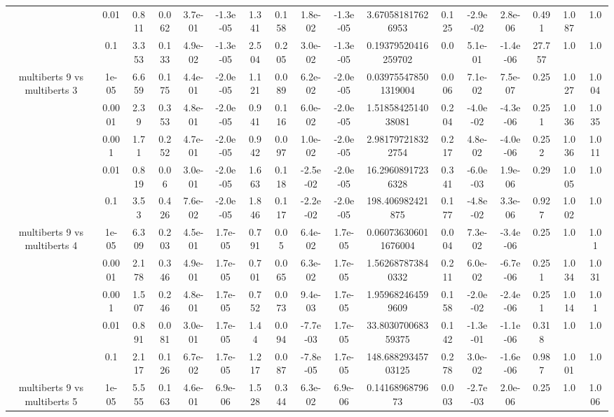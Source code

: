 \begin{tabular}{|c|c|c|c|c|c|c|c|c|c|c|c|c|c|c|c|c|}
 & 0.01 & 0.811 & 0.062 & 3.7e-01 & -1.3e-05 & 1.341 & 0.158 & 1.8e-02 & -1.3e-05 & 3.670581817626953 & 0.125 & -2.9e-02 & 2.8e-06 & 0.491 & 1.087 & 1.0 \\
 & 0.1 & 3.353 & 0.133 & 4.9e-02 & -1.3e-05 & 2.504 & 0.205 & 3.0e-02 & -1.3e-05 & 0.19379520416259702 & 0.0 & 5.1e-01 & -1.4e-06 & 27.757 & 1.0 & 1.0 \\
\hline
\multirow{5}{*}{multiberts 9 vs multiberts 3} & 1e-05 & 6.659 & 0.175 & 4.4e-01 & -2.0e-05 & 1.121 & 0.089 & 6.2e-02 & -2.0e-05 & 0.039755478501319004 & 0.006 & 7.1e-02 & 7.5e-07 & 0.25 & 1.027 & 1.004 \\
 & 0.0001 & 2.39 & 0.353 & 4.8e-01 & -2.0e-05 & 0.941 & 0.116 & 6.0e-02 & -2.0e-05 & 1.5185842514038081 & 0.204 & -4.0e-02 & -4.3e-06 & 0.251 & 1.036 & 1.035 \\
 & 0.001 & 1.71 & 0.252 & 4.7e-01 & -2.0e-05 & 0.942 & 0.097 & 1.0e-02 & -2.0e-05 & 2.981797218322754 & 0.217 & 4.8e-02 & -4.0e-06 & 0.252 & 1.036 & 1.011 \\
 & 0.01 & 0.819 & 0.06 & 3.0e-01 & -2.0e-05 & 1.663 & 0.118 & -2.5e-02 & -2.0e-05 & 16.29608917236328 & 0.341 & -6.0e-03 & 1.9e-06 & 0.29 & 1.005 & 1.0 \\
 & 0.1 & 3.53 & 0.426 & 7.6e-02 & -2.0e-05 & 1.846 & 0.117 & -2.2e-02 & -2.0e-05 & 198.406982421875 & 0.177 & -4.8e-02 & 3.3e-06 & 0.927 & 1.002 & 1.0 \\
\hline
\multirow{5}{*}{multiberts 9 vs multiberts 4} & 1e-05 & 6.309 & 0.203 & 4.5e-01 & 1.7e-05 & 0.791 & 0.05 & 6.4e-02 & 1.7e-05 & 0.060736306011676004 & 0.004 & 7.3e-02 & -3.4e-06 & 0.25 & 1.0 & 1.01 \\
 & 0.0001 & 2.178 & 0.346 & 4.9e-01 & 1.7e-05 & 0.701 & 0.065 & 6.3e-02 & 1.7e-05 & 1.562687873840332 & 0.211 & 6.0e-02 & -6.7e-06 & 0.251 & 1.034 & 1.031 \\
 & 0.001 & 1.507 & 0.246 & 4.8e-01 & 1.7e-05 & 0.752 & 0.073 & 9.4e-03 & 1.7e-05 & 1.959682464599609 & 0.158 & -2.0e-02 & -2.4e-06 & 0.251 & 1.014 & 1.01 \\
 & 0.01 & 0.891 & 0.081 & 3.0e-01 & 1.7e-05 & 1.44 & 0.094 & -7.7e-03 & 1.7e-05 & 33.803070068359375 & 0.142 & -1.3e-01 & -1.1e-06 & 0.318 & 1.0 & 1.0 \\
 & 0.1 & 2.117 & 0.126 & 6.7e-02 & 1.7e-05 & 1.217 & 0.087 & -7.8e-05 & 1.7e-05 & 148.68829345703125 & 0.278 & 3.0e-02 & -1.6e-06 & 0.987 & 1.001 & 1.0 \\
\hline
\multirow{5}{*}{multiberts 9 vs multiberts 5} & 1e-05 & 5.555 & 0.163 & 4.6e-01 & 6.9e-06 & 1.528 & 0.344 & 6.3e-02 & 6.9e-06 & 0.1416896879673 & 0.003 & -2.7e-03 & 2.0e-06 & 0.25 & 1.0 & 1.006 \\

\end{tabular}
